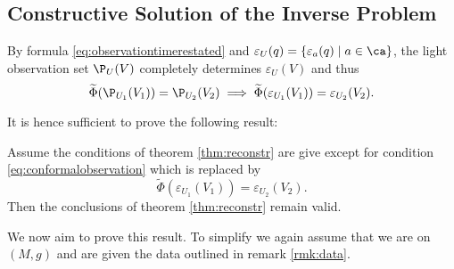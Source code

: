 \subsection{Constructive Solution of the Inverse Problem}
By formula \ref{eq:observationtimerestated} and $\varepsilon_U(q) = \{\varepsilon_a(q) \mid a\in \ca \}$, the light observation set $\P_U(V)$ completely determines $\varepsilon_U(V)$ and thus 
\[
\widetilde{\Phi}(\P_{U_1}(V_1)) = \P_{U_2}(V_2) \implies \widetilde{\Phi}(\varepsilon_{U_1}(V_1)) = \varepsilon_{U_2}(V_2).
\]

It is hence sufficient to prove the following result:
\begin{theorem}
Assume the conditions of theorem \ref{thm:reconstr} are give except for condition \ref{eq:conformalobservation} which is replaced by
\[
    \widetilde{\Phi}(\varepsilon_{U_1}(V_1)) = \varepsilon_{U_2}(V_2).
\]
Then the conclusions of theorem \ref{thm:reconstr} remain valid.
\end{theorem}

We now aim to prove this result. To simplify we again assume that we are on $(M,g)$ and are given the data outlined in remark \ref{rmk:data}.

